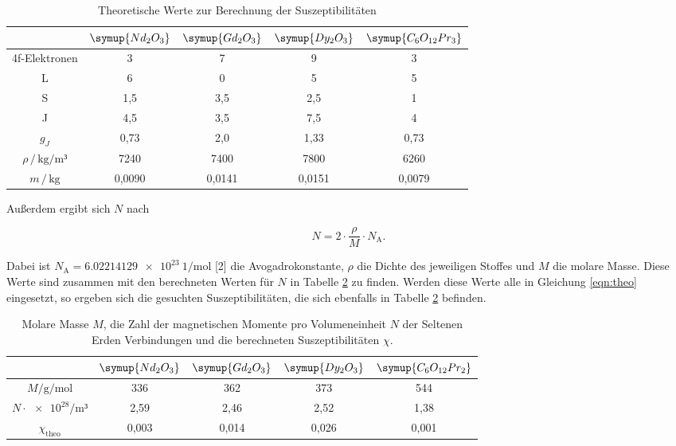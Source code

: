 \begin{table}
\centering
\caption{Theoretische Werte zur Berechnung der Suszeptibilitäten}
\label{tab:theo}
\begin{tabular}{c c c c c}
\toprule
& $\symup{Nd_2O_3}$ & $\symup{Gd_2O_3}$ & $\symup{Dy_2O_3}$ & $\symup{C_6O_{12}Pr_3}$\\
\midrule
4f-Elektronen                             & 3      & 7      & 9      & 3\\
L                                         & 6      & 0      & 5      & 5\\
S                                         & 1,5    & 3,5    & 2,5    & 1\\
J                                         & 4,5    & 3,5    & 7,5    & 4\\
$g_J$                                     & 0,73   & 2,0    & 1,33   & 0,73\\
$\rho \, / \, \si{\kilo\gram\per\meter³}$ & 7240   & 7400   & 7800   & 6260\\
$m \, / \, \si{\kilo\gram}$               & 0,0090 & 0,0141 & 0,0151 & 0,0079\\
\bottomrule
\end{tabular}
\end{table}


Außerdem ergibt sich $N$ nach

\begin{equation*}
N = 2 \cdot \frac{\rho}{M}\cdot N_\text{A}.
\end{equation*}

Dabei ist $N_\text{A} = \SI{6.02214129e23}{1\per\mol}$ [2] die 
Avogadrokonstante, $\rho$ die Dichte des jeweiligen Stoffes und $M$
die molare Masse. Diese Werte sind zusammen mit den berechneten Werten für $N$
in Tabelle \ref{tab:theo2} zu finden. Werden diese Werte alle in Gleichung  
\eqref{eqn:theo} eingesetzt, so ergeben sich die gesuchten Suszeptibilitäten, die sich ebenfalls in 
Tabelle \ref{tab:theo2} befinden. 

\begin{table}
\centering
\caption{Molare Masse $M$, die Zahl der magnetischen Momente
pro Volumeneinheit $N$ der Seltenen Erden Verbindungen und die berechneten 
Suszeptibilitäten $\chi$.}
\label{tab:theo2}
\begin{tabular}{c c c c c}
\toprule
& $\symup{Nd_2O_3}$ & $\symup{Gd_2O_3}$ & $\symup{Dy_2O_3}$ & $\symup{C_6O_{12}Pr_2}$\\
\midrule
$M/\si{\gram\per\mol}$           & 336   & 362   & 373   & 544\\
$N \cdot \num{e28}/\si{\meter³}$ & 2,59  & 2,46  & 2,52  & 1,38\\
$\chi_\text{theo}$               & 0,003 & 0,014 & 0,026 & 0,001\\
\bottomrule
\end{tabular}
\end{table}


